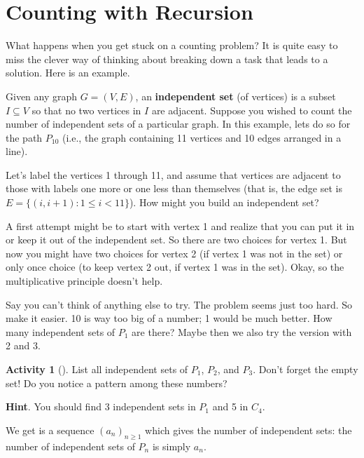 \documentclass[10pt,]{book}
\newcommand{\terminology}[1]{\textbf{#1}}
\theoremstyle{plain}
\theoremstyle{definition}
\theoremstyle{definition}
\theoremstyle{definition}
\newtheorem{activity}[project]{Activity}
\theoremstyle{definition}
\numberwithin{equation}{chapter}
\def\st{:}
\newcommand{\lt}{<}
\begin{document}
\section[{Counting with Recursion}]{Counting with Recursion}\label{sec_basic-recursion}
\hypertarget{p-785}{}%
What happens when you get stuck on a counting problem?  It is quite easy to miss the clever way of thinking about breaking down a task that leads to a solution.  Here is an example.%
\par
\hypertarget{p-786}{}%
Given any graph \(G = (V, E)\), an \terminology{independent set} (of vertices) is a subset \(I \subseteq V\) so that no two vertices in \(I\) are adjacent.  Suppose you wished to count the number of independent sets of a particular graph.  In this example, lets do so for the path \(P_{10}\) (i.e., the graph containing 11 vertices and 10 edges arranged in a line).%
\par
\hypertarget{p-787}{}%
Let's label the vertices 1 through 11, and assume that vertices are adjacent to those with labels one more or one less than themselves (that is, the edge set is \(E = \{(i,i+1) \st 1 \le i \lt 11\}\)).  How might you build an independent set?%
\par
\hypertarget{p-788}{}%
A first attempt might be to start with vertex 1 and realize that you can put it in or keep it out of the independent set.  So there are two choices for vertex 1.  But now you might have two choices for vertex 2 (if vertex 1 was not in the set) or only once choice (to keep vertex 2 out, if vertex 1 was in the set).  Okay, so the multiplicative principle doesn't help.%
\par
\hypertarget{p-789}{}%
Say you can't think of anything else to try.  The problem seems just too hard.  So make it easier.  10 is way too big of a number; 1 would be much better.  How many independent sets of \(P_1\) are there?  Maybe then we also try the version with 2 and 3.%
\begin{activity}[]\label{activity-75}
\hypertarget{p-790}{}%
List all independent sets of \(P_1\), \(P_2\), and \(P_3\).  Don't forget the empty set! Do you notice a pattern among these numbers?%
\par\smallskip%
\noindent\textbf{Hint}.\hypertarget{hint-67}{}\quad%
\hypertarget{p-791}{}%
You should find 3 independent sets in \(P_1\) and 5 in \(C_4\).%
\end{activity}
\hypertarget{p-792}{}%
We get is a sequence \((a_n)_{n \ge 1}\) which gives the number of independent sets: the number of independent sets of \(P_n\) is simply \(a_n\).%
\end{document}
